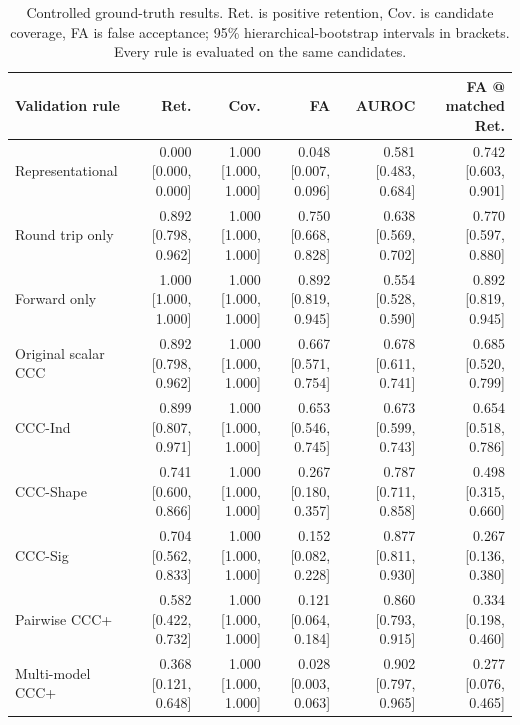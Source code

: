 \begin{table}[t]
\centering
\small
\begin{tabular}{lrrrrr}
\toprule
Validation rule & Ret. & Cov. & FA & AUROC & FA @ matched Ret. \\
\midrule
Representational & 0.000 [0.000, 0.000] & 1.000 [1.000, 1.000] & 0.048 [0.007, 0.096] & 0.581 [0.483, 0.684] & 0.742 [0.603, 0.901] \\
Round trip only & 0.892 [0.798, 0.962] & 1.000 [1.000, 1.000] & 0.750 [0.668, 0.828] & 0.638 [0.569, 0.702] & 0.770 [0.597, 0.880] \\
Forward only & 1.000 [1.000, 1.000] & 1.000 [1.000, 1.000] & 0.892 [0.819, 0.945] & 0.554 [0.528, 0.590] & 0.892 [0.819, 0.945] \\
Original scalar CCC & 0.892 [0.798, 0.962] & 1.000 [1.000, 1.000] & 0.667 [0.571, 0.754] & 0.678 [0.611, 0.741] & 0.685 [0.520, 0.799] \\
CCC-Ind & 0.899 [0.807, 0.971] & 1.000 [1.000, 1.000] & 0.653 [0.546, 0.745] & 0.673 [0.599, 0.743] & 0.654 [0.518, 0.786] \\
CCC-Shape & 0.741 [0.600, 0.866] & 1.000 [1.000, 1.000] & 0.267 [0.180, 0.357] & 0.787 [0.711, 0.858] & 0.498 [0.315, 0.660] \\
CCC-Sig & 0.704 [0.562, 0.833] & 1.000 [1.000, 1.000] & 0.152 [0.082, 0.228] & 0.877 [0.811, 0.930] & 0.267 [0.136, 0.380] \\
Pairwise CCC+ & 0.582 [0.422, 0.732] & 1.000 [1.000, 1.000] & 0.121 [0.064, 0.184] & 0.860 [0.793, 0.915] & 0.334 [0.198, 0.460] \\
Multi-model CCC+ & 0.368 [0.121, 0.648] & 1.000 [1.000, 1.000] & 0.028 [0.003, 0.063] & 0.902 [0.797, 0.965] & 0.277 [0.076, 0.465] \\
\bottomrule
\end{tabular}
\caption{Controlled ground-truth results. Ret. is positive retention, Cov. is candidate coverage, FA is false acceptance; 95\% hierarchical-bootstrap intervals in brackets. Every rule is evaluated on the same candidates.}
\label{tab:table_5_1_controlled}
\end{table}